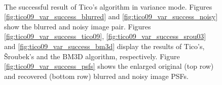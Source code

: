 \documentclass[12pt,notitlepage]{report}
\begin{document}
\begin{figure}[htb]
	  ~
	  ~
  \caption[The successful result of Tico's algorithm in variance mode]{The successful result of Tico's algorithm in variance mode. Figures \ref{fig:tico09_var_success_blurred} and \ref{fig:tico09_var_success_noisy} show the blurred and noisy image pair. Figures \ref{fig:tico09_var_success_tico09}, \ref{fig:tico09_var_success_srou03} and \ref{fig:tico09_var_success_bm3d} display the results of Tico's, Šroubek's and the BM3D algorithm, respectively. Figure \ref{fig:tico09_var_success_psfs} shows the enlarged original (top row) and recovered (bottom row) blurred and noisy image PSFs.}
  \label{fig:tico09_var_success}
\end{figure}
	
\clearpage
\end{document}

